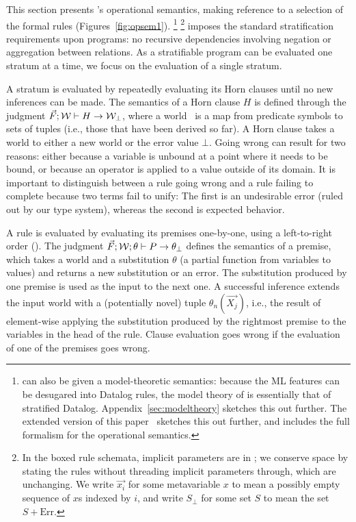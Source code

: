 \documentclass[acmsmall,screen,nonacm]{acmart}
\theoremstyle{definition}
\begin{document}
This section presents \Name's operational semantics, making reference
to a selection of the formal rules (Figures~\ref{fig:opsem1}).%
\footnote{%
\Name can also be given a model-theoretic semantics: because the ML
features can be desugared into Datalog rules, the model theory of \Name is
essentially that of stratified Datalog.
\iffull Appendix~\ref{sec:modeltheory} sketches this out further.
\else
The extended version of this paper~\citep{formulog_ext} sketches this out further,
and includes the full formalism for the operational semantics.\fi}%
\footnote{In the boxed rule schemata, implicit parameters are in
; we conserve space by stating the rules without threading
implicit parameters through, which are unchanging.
We write $\vec{x_i}$ for some metavariable $x$ to mean a possibly empty sequence
of $x$s indexed by $i$, and write $S_\bot$ for some set $S$ to mean the set $S +
\mathrm{Err}$.}
\Name imposes the standard stratification requirements upon programs: no
recursive dependencies involving negation or aggregation between relations.
As a stratifiable program can be evaluated one stratum at a time, we focus on
the evaluation of a single stratum.

A stratum is evaluated by repeatedly evaluating its Horn clauses until no new
inferences can be made.
The semantics of a Horn clause $H$ is defined through the judgment $\vec{F};
\mathcal{W} \vdash H \rightarrow \mathcal{W}_\bot$, where a world \world\ is a map from
predicate symbols to sets of tuples (i.e., those that have been derived so
far).
A Horn clause takes a world to either a new world or the error value $\bot$.
Going wrong can result for two reasons: either because a variable is unbound at
a point where it needs to be bound, or because an operator is applied to a
value outside of its domain.
It is important to distinguish between a rule going wrong and a rule failing to
complete because two terms fail to unify:
The first is an undesirable error (ruled out by our type system), whereas the
second is expected behavior.

A rule is evaluated by evaluating its premises one-by-one, using a
left-to-right order ().
The judgment $\vec{F}; \mathcal{W}; \theta \vdash P \rightarrow \theta_\bot$ defines
the semantics of a premise, which takes a world and a substitution $\theta$ (a
partial function from variables to values) and returns a new substitution or
an error.
The substitution produced by one premise is used as the input to the next one.
A successful inference extends the input world with a (potentially novel) tuple
$\theta_n(\vec{X_j})$, i.e., the result of element-wise applying the
substitution produced by the rightmost premise to the variables in the head of
the rule.
Clause evaluation goes wrong if the evaluation of one of the premises goes
wrong.
\end{document}
